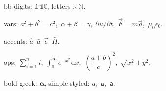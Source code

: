 \documentclass{article}
\begin{document}
bb digits: $\mathbb{1}\ \mathbb{10}$, letters $\mathbb{R}\ \mathbb{N}$.

vars: $a^2+b^2=c^2$,\ $\alpha+\beta=\gamma$,\ $\partial u/\partial t$,\
$\vec{F}=m\vec{a}$,\ $\mu_0\epsilon_0$.

accents: $\hat{a}$\ $\bar{a}$\ $\vec{a}$\ $\bar{H}$.

ops: $\sum_{i=1}^{n} i$,\ $\int_{0}^{\infty} e^{-x^2}\,\mathrm{d}x$,\
$\left( \dfrac{a+b}{c} \right)^{2}$,\ $\sqrt{x^{2}+y^{2}}$.

bold greek: $\symbf{\alpha}$, simple styled: $\mathit{a}$,\ $\mathtt{a}$,\ $\mathsf{a}$.
\end{document}
